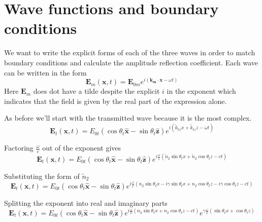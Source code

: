 \documentclass[10pt,a4paper]{article}
\begin{document}
\section{Wave functions and boundary conditions}
We want to write the explicit forms of each of the three waves in order to match boundary conditions and calculate the amplitude reflection coefficient.  Each wave can be written in the form \begin{equation}
\mathbf{E}_m(\mathbf{x},t)=\mathbf{E}_{0m}e^{i(\mathbf{k_m}\cdot\mathbf{x}-\omega t)}
\end{equation}
Here $\mathbf{E}_m$ does dot have a tilde despite the explicit $i$ in the exponent which indicates that the field is given by the real part of the expression alone.

As before we'll start with the transmitted wave because it is the most complex.
\begin{equation}
\mathbf{E}_t(\mathbf{x},t)=E_{0t}(\cos\theta_t\mathbf{\hat{x}}-\sin\theta_t\mathbf{\hat{z}})e^{i(\tilde{k}_{tx}x+\tilde{k}_{tz}z-\omega t)}
\end{equation}

Factoring $\frac{\omega}{c}$ out of the exponent gives
\begin{equation}
\mathbf{E}_t(\mathbf{x},t)=E_{0t}(\cos\theta_t\mathbf{\hat{x}}-\sin\theta_t\mathbf{\hat{z}})
e^{i\frac{\omega}{c}(\tilde{n}_2\sin\theta_tx+\tilde{n}_2\cos\theta_tz-ct)}
\end{equation}

Substituting the form of $\tilde{n}_2$
\begin{equation}
\mathbf{E}_t(\mathbf{x},t)=E_{0t}(\cos\theta_t\mathbf{\hat{x}}-\sin\theta_t\mathbf{\hat{z}})
e^{i\frac{\omega}{c}(n_2\sin\theta_tx-i\gamma\sin\theta_t x+n_2\cos\theta_tz-i\gamma \cos\theta_tz-ct)}
\end{equation}

Splitting the exponent into real and imaginary parts
\begin{equation}
\mathbf{E}_t(\mathbf{x},t)=E_{0t}(\cos\theta_t\mathbf{\hat{x}}-\sin\theta_t\mathbf{\hat{z}})
e^{i\frac{\omega}{c}(n_2\sin\theta_tx+n_2\cos\theta_tz-ct)}
e^{\gamma\frac{\omega}{c}(\sin\theta_tx+\cos\theta_tz)}
\end{equation}
\end{document}
